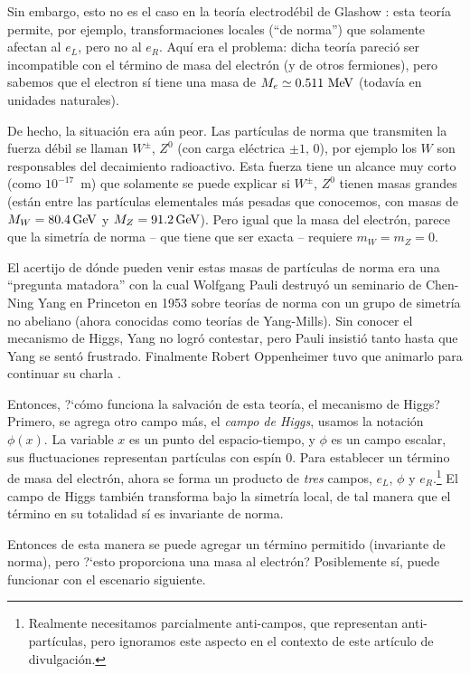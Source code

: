 Sin embargo, esto no es el caso en la teor\'ia electrod\'ebil de Glashow
\cite{Glashow}: esta teor\'ia permite, por ejemplo, transformaciones
locales (``de norma'') que solamente afectan al $e_L$, pero no al $e_R$.
Aqu\'i era el problema: dicha teor\'ia pareci\'o ser incompatible con
el t\'ermino de masa del electr\'on (y de otros fermiones), pero sabemos
que el electron s\'i tiene una masa de $M_e \simeq 0.511\ {\rm MeV}$
(todav\'ia en unidades naturales).

De hecho, la situaci\'on era a\'un peor. Las part\'iculas de norma
que transmiten la fuerza d\'ebil se llaman $W^{\pm}$, $Z^0$
(con carga el\'ectrica $\pm1, \, 0$), por ejemplo los $W$ son
responsables del decaimiento radioactivo. Esta fuerza tiene un
alcance muy corto (como $10^{-17}$~m) que solamente se puede
explicar si $W^{\pm}$, $Z^0$ tienen masas grandes (est\'an entre
las part\'iculas elementales m\'as pesadas que conocemos, con
masas de $M_W = 80.4 \, {\rm GeV}$ y $M_Z = 91.2\,{\rm GeV}$). 
Pero igual que la masa del electr\'on, parece que la simetr\'ia
de norma -- que tiene que ser exacta -- requiere $m_W = m_Z = 0$.

El acertijo de d\'onde pueden venir estas masas de part\'iculas
de norma era una ``pregunta matadora'' con la cual Wolfgang Pauli
destruy\'o un seminario de Chen-Ning Yang en Princeton en 1953
sobre teor\'ias de
norma con un grupo de simetr\'ia no abeliano (ahora conocidas como
teor\'ias de Yang-Mills). Sin conocer el mecanismo de Higgs, Yang no
logr\'o contestar, pero Pauli insisti\'o tanto hasta
que Yang se sent\'o frustrado. Finalmente Robert Oppenheimer tuvo
que animarlo para continuar su charla \cite{Shifman}.

Entonces, ?`c\'omo funciona la salvaci\'on de esta teor\'ia,
el mecanismo de Higgs? Primero, se agrega otro campo m\'as,
el {\em campo de Higgs}, usamos la notaci\'on $\phi (x)$.
La variable $x$ es un punto del espacio-tiempo, y $\phi$ es
un campo escalar, sus fluctuaciones representan part\'iculas 
con esp\'in 0. Para establecer un t\'ermino de masa del electr\'on,
ahora se forma un producto de {\em tres} campos, $e_L$, $\phi$ y
$e_R$.\footnote{Realmente necesitamos parcialmente anti-campos,
que representan anti-part\'iculas, pero ignoramos
este aspecto en el contexto de este art\'iculo de divulgaci\'on.}
El campo de Higgs tambi\'en transforma bajo la simetr\'ia local,
de tal manera que el t\'ermino en su totalidad s\'i es invariante
de norma.

Entonces de esta manera se puede agregar un t\'ermino permitido
(invariante de norma), pero ?`esto proporciona una masa al electr\'on?
Posiblemente s\'i, puede funcionar con el escenario siguiente.

